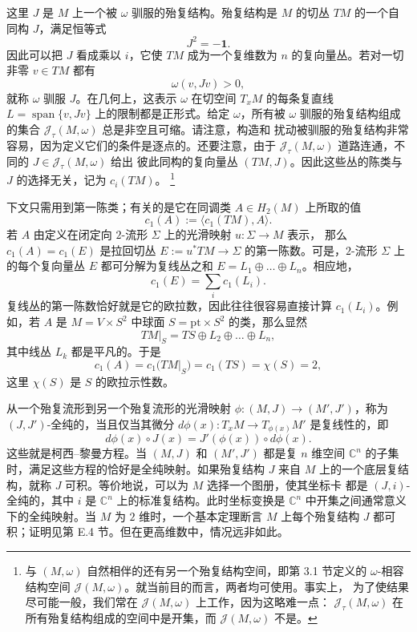 这里 $J$ 是 $M$ 上一个被 $\omega$ 驯服的殆复结构。殆复结构是 $M$ 的切丛 $TM$
的一个自同构 $J$，满足恒等式
\[
  J^2=-\mathbf 1.
\]
因此可以把 $J$ 看成乘以 $i$，它使 $TM$ 成为一个复维数为 $n$ 的复向量丛。若对一切
非零 $v\in TM$ 都有
\[
  \omega(v,Jv)>0,
\]
就称 $\omega$ 驯服 $J$。在几何上，这表示 $\omega$ 在切空间 $T_xM$ 的每条复直线
$L=\operatorname{span}\{v,Jv\}$ 上的限制都是正形式。给定 $\omega$，所有被 $\omega$
驯服的殆复结构组成的集合 $\mathcal J_\tau(M,\omega)$ 总是非空且可缩。请注意，构造和
扰动被驯服的殆复结构非常容易，因为定义它们的条件是逐点的。还要注意，由于
$\mathcal J_\tau(M,\omega)$ 道路连通，不同的 $J\in\mathcal J_\tau(M,\omega)$ 给出
彼此同构的复向量丛 $(TM,J)$。因此这些丛的陈类与 $J$ 的选择无关，记为 $c_i(TM)$。
\footnote{与 $(M,\omega)$ 自然相伴的还有另一个殆复结构空间，即第 3.1 节定义的
$\omega$-相容结构空间 $\mathcal J(M,\omega)$。就当前目的而言，两者均可使用。事实上，
为了使结果尽可能一般，我们常在 $\mathcal J(M,\omega)$ 上工作，因为这略难一点：
$\mathcal J_\tau(M,\omega)$ 在所有殆复结构组成的空间中是开集，而
$\mathcal J(M,\omega)$ 不是。}

下文只需用到第一陈类；有关的是它在同调类 $A\in H_2(M)$ 上所取的值
\[
  c_1(A):=\langle c_1(TM),A\rangle.
\]
若 $A$ 由定义在闭定向 $2$-流形 $\Sigma$ 上的光滑映射 $u:\Sigma\to M$ 表示，
那么 $c_1(A)=c_1(E)$ 是拉回切丛 $E:=u^*TM\to\Sigma$ 的第一陈数。可是，$2$-流形
$\Sigma$ 上的每个复向量丛 $E$ 都可分解为复线丛之和
$E=L_1\oplus\dots\oplus L_n$。相应地，
\[
  c_1(E)=\sum_i c_1(L_i).
\]
复线丛的第一陈数恰好就是它的欧拉数，因此往往很容易直接计算 $c_1(L_i)$。例如，若
$A$ 是 $M=V\times S^2$ 中球面 $S=\mathrm{pt}\times S^2$ 的类，那么显然
\[
  TM\big|_S=TS\oplus L_2\oplus\dots\oplus L_n,
\]
其中线丛 $L_k$ 都是平凡的。于是
\[
  c_1(A)=c_1\bigl(TM\big|_S\bigr)=c_1(TS)=\chi(S)=2,
\]
这里 $\chi(S)$ 是 $S$ 的欧拉示性数。

从一个殆复流形到另一个殆复流形的光滑映射
$\phi:(M,J)\to(M',J')$，称为 $(J,J')$-全纯的，当且仅当其微分
$d\phi(x):T_xM\to T_{\phi(x)}M'$ 是复线性的，即
\[
  d\phi(x)\circ J(x)=J'(\phi(x))\circ d\phi(x).
\]
这些就是柯西--黎曼方程。当 $(M,J)$ 和 $(M',J')$ 都是复 $n$ 维空间
$\mathbb C^n$ 的子集时，满足这些方程的恰好是全纯映射。如果殆复结构 $J$ 来自 $M$
上的一个底层复结构，就称 $J$ 可积。等价地说，可以为 $M$ 选择一个图册，使其坐标卡
都是 $(J,i)$-全纯的，其中 $i$ 是 $\mathbb C^n$ 上的标准复结构。此时坐标变换是
$\mathbb C^n$ 中开集之间通常意义下的全纯映射。当 $M$ 为 $2$ 维时，一个基本定理断言
$M$ 上每个殆复结构 $J$ 都可积；证明见第 E.4 节。但在更高维数中，情况远非如此。

